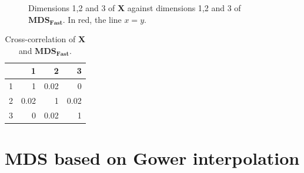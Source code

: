 \documentclass[11pt]{report}
\begin{document}
\begin{figure}[!ht]
    \centering
    \caption{Dimensions 1,2 and 3 of \textbf{X} against dimensions 1,2 and 3 of  $\mathbf{MDS_{Fast}}$. \newline
            In red, the line $x=y$.}%
    \label{fast_example}%
\end{figure}


\begin{table}[ht]
\centering
\begin{tabular}{rrrr}
 & 1 & 2 & 3 \\ 
  \hline
  1 & 1 & 0.02 & 0 \\ 
  2 & 0.02 & 1 & 0.02 \\ 
  3 & 0 & 0.02 & 1 \\ 
   \hline
\end{tabular}
\caption{Cross-correlation of \textbf{X} and $\mathbf{MDS_{Fast}}$.} 
\label{corr_fast}
\end{table}

\section{MDS based on Gower interpolation}
\end{document}
